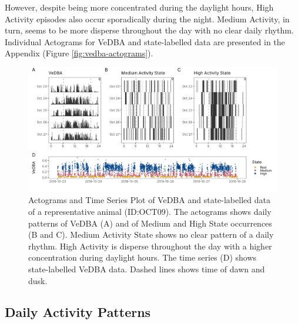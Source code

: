 \documentclass[english,msc,numbers,hidelinks]{coppe}
\begin{document}
  However, despite being more concentrated during the daylight hours, High Activity episodes also occur sporadically during the night. Medium Activity, in turn, seems to be more disperse throughout the day with no clear daily rhythm. Individual Actograms for VeDBA and state-labelled data are presented in the Appendix (Figure \ref{fig:vedba-actograms}).
  \begin{figure}

  {\centering \includegraphics[width=1\linewidth]{../04_figures/actograms/actograms_results} 

  }

  \caption{Actograms and Time Series Plot of VeDBA and state-labelled data of a representative animal (ID:OCT09). The actograms shows daily patterns of VeDBA (A) and of Medium and High State occurrences (B and C). Medium Activity State shows no clear pattern of a daily rhythm. High Activity is disperse throughout the day with a higher concentration during daylight hours. The time series (D) shows state-labelled VeDBA data. Dashed lines shows time of dawn and dusk.}\label{fig:actograms-results}
  \end{figure}
  \clearpage

  \hypertarget{daily-activity-patterns}{%
  \subsection{Daily Activity Patterns}\label{daily-activity-patterns}}
\end{document}
